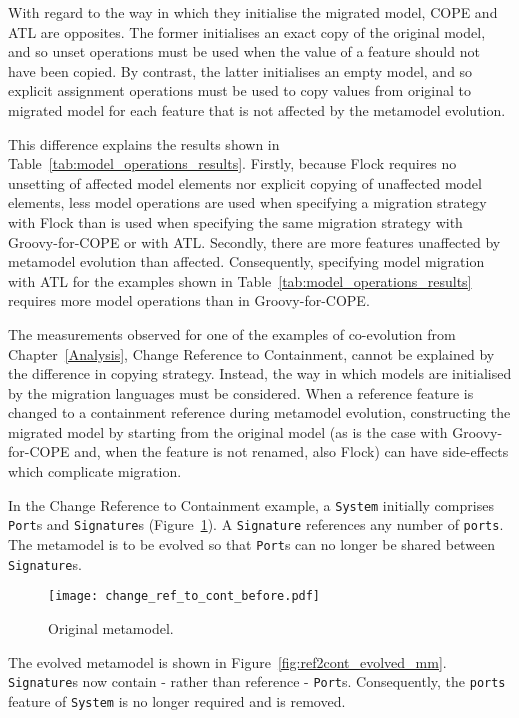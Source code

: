 With regard to the way in which they initialise the migrated model, COPE and ATL are opposites. The former initialises an exact copy of the original model, and so unset operations must be used when the value of a feature should not have been copied. By contrast, the latter initialises an empty model, and so explicit assignment operations must be used to copy values from original to migrated model for each feature that is not affected by the metamodel evolution.

This difference explains the results shown in Table~\ref{tab:model_operations_results}. Firstly, because Flock requires no unsetting of affected model elements nor explicit copying of unaffected model elements, less model operations are used when specifying a migration strategy with Flock than is used when specifying the same migration strategy with Groovy-for-COPE or with ATL. Secondly, there are more features unaffected by metamodel evolution than affected. Consequently, specifying model migration with ATL for the examples shown in Table~\ref{tab:model_operations_results} requires more model operations than in Groovy-for-COPE.


The measurements observed for one of the examples of co-evolution from Chapter~\ref{Analysis}, Change Reference to Containment, cannot be explained by the difference in copying strategy. Instead, the way in which models are initialised by the migration languages must be considered. When a reference feature is changed to a containment reference during metamodel evolution, constructing the migrated model by starting from the original model (as is the case with Groovy-for-COPE and, when the feature is not renamed, also Flock) can have side-effects which complicate migration.

In the Change Reference to Containment example, a \texttt{System} initially comprises \texttt{Port}s and \texttt{Signature}s (Figure~\ref{fig:ref2cont_original_mm}). A \texttt{Signature} references any number of \texttt{ports}. The metamodel is to be evolved so that \texttt{Port}s can no longer be shared between \texttt{Signature}s.

\begin{figure}[htbp]
  \centering
  \texttt{[image: change\_ref\_to\_cont\_before.pdf]}
  \caption{Original metamodel.}
  \label{fig:ref2cont_original_mm}
\end{figure}

The evolved metamodel is shown in Figure~\ref{fig:ref2cont_evolved_mm}. \texttt{Signature}s now contain - rather than reference - \texttt{Port}s. Consequently, the \texttt{ports} feature of \texttt{System} is no longer required and is removed.

